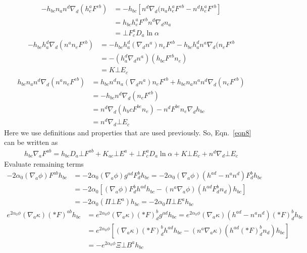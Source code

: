 \documentclass[prd]{revtex4}
\begin{document}
\begin{align}
- h_{bc} n_a n^d \nabla_d (h_e^a F^{eb}) &= - h_{bc} [n^d \nabla_d (n_a h_e^a F^{eb} - n^d h_e^a F^{eb}] \nonumber \\
							       &= h_{bc} h_e^a F^{eb} n^d \nabla_d n_a \nonumber \\
							       &=\bot F_c^a D_a \ln \alpha
\end{align}
\begin{align}
-h_{bc} h_a^d \nabla_d (n^a n_e F^{eb}) &= - h_{bc} h_a^d (\nabla_d n^a) n_e F^{eb} - h_{bc} h_a^d n^a \nabla_d (n_e F^{eb} \nonumber \\
							       &= -(h_a^d \nabla_d n^a) (h_{bc} F^{eb} n_e) \nonumber \\
							       &=K \bot E_c
\end{align}
\begin{align}
h_{bc} n_a n^d \nabla_d (n^a n_e F^{eb}) &= h_{bc} n^d n_a (\nabla_d n^a) n_e F^{eb} + h_{bc} n_a n^a n^d \nabla_d (n_e F^{eb}) \nonumber \\
								&= - h_{bc} n^d \nabla_d (n_e F^{eb}) \nonumber \\
								&= n^d \nabla_d (h_bc F^{be} n_e) - n^d F^{be} n_e \nabla_d h_{bc} \nonumber \\
								&=n^d \nabla_d \bot E_c 
\end{align}
Here we use definitions and properties that are used previously. So, Eqn.~\ref{eqn8} can be written as
\begin{align}
h_{bc} \nabla_a F^{ab} = h_{bc} D_a \bot F^{ab}  + K_{ac} \bot E^a + \bot F_c^a D_a \ln \alpha + K \bot E_c + n^d \nabla_d \bot E_c 
\end{align} 
Evaluate remaining terms
\begin{align}
-2 \alpha_0 (\nabla_a \phi) F^{ab} h_{bc} &= -2 \alpha_0 (\nabla_a \phi) g^{ad} F_d^{b} h_{bc}  = -2 \alpha_0 (\nabla_a \phi) (h^{ad} - n^a n^d) F_d^{b} h_{bc} \nonumber \\
							       &=-2 \alpha_0[(\nabla_a \phi) F_d^b h^{ad} h_{bc}  - (n^a \nabla_a \phi) (h^{ad} F_d^b n_d) h_{bc}] \nonumber \\
							       &=-2 \alpha_0 ( \Pi \bot E^a) h_{bc} = -2 \alpha_0 \Pi \bot E^a h_{bc}
\end{align}
\begin{align}
e^{2 \alpha_0 \phi} (\nabla_a \kappa) (\ast F)^{ab} h_{bc} &= e^{2 \alpha_0 \phi} (\nabla_a \kappa) (\ast F)_d^{b} g^{ad} h_{bc} = e^{2 \alpha_0 \phi} (\nabla_a \kappa) (h^{ad} - n^a n^d) (\ast F)_d^{b} h_{bc} \nonumber \\
											&=e^{2 \alpha_0 \phi} [ (\nabla_a \kappa) (\ast F)_d^{b} h^{ad} h_{bc} - (n^a \nabla_a \kappa) (h^{ad} (\ast F)_d^{b} n_d) h_{bc} ] \nonumber \\
											&=- e^{2 \alpha_0 \phi} \Xi \bot B^a h_{bc}			
\end{align}
\end{document}
